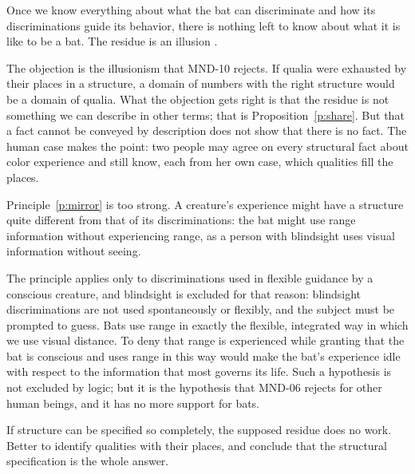 \documentclass{situationist-preprint}
\begin{document}
\begin{objection}[Dennett]\label{o:dennett}
Once we know everything about what the bat can discriminate and how its discriminations guide its behavior, there is nothing left to know about what it is like to be a bat. The residue is an illusion \citep{Dennett1991}.
\end{objection}

\begin{reply}
The objection is the illusionism that MND-10 rejects. If qualia were exhausted by their places in a structure, a domain of numbers with the right structure would be a domain of qualia. What the objection gets right is that the residue is not something we can describe in other terms; that is Proposition~\ref{p:share}. But that a fact cannot be conveyed by description does not show that there is no fact. The human case makes the point: two people may agree on every structural fact about color experience and still know, each from her own case, which qualities fill the places.
\end{reply}

\begin{objection}[Mirroring]\label{o:mirror}
Principle~\ref{p:mirror} is too strong. A creature's experience might have a structure quite different from that of its discriminations: the bat might use range information without experiencing range, as a person with blindsight uses visual information without seeing.
\end{objection}

\begin{reply}
The principle applies only to discriminations used in flexible guidance by a conscious creature, and blindsight is excluded for that reason: blindsight discriminations are not used spontaneously or flexibly, and the subject must be prompted to guess. Bats use range in exactly the flexible, integrated way in which we use visual distance. To deny that range is experienced while granting that the bat is conscious and uses range in this way would make the bat's experience idle with respect to the information that most governs its life. Such a hypothesis is not excluded by logic; but it is the hypothesis that MND-06 rejects for other human beings, and it has no more support for bats.
\end{reply}

\begin{objection}[Structuralism]\label{o:structuralism}
If structure can be specified so completely, the supposed residue does no work. Better to identify qualities with their places, and conclude that the structural specification is the whole answer.
\end{objection}
\end{document}
